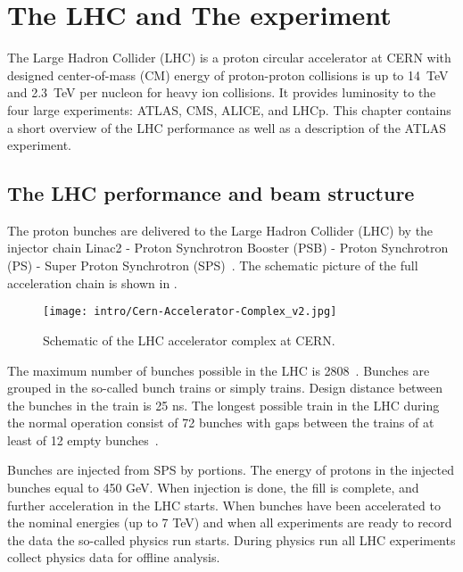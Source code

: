 

\chapter{The LHC and The \ATLAS experiment}
\label{chap:MoreStuff}

The Large Hadron Collider (LHC) is a proton circular accelerator at CERN with designed center-of-mass (CM) energy of proton-proton collisions is up to 14~TeV and 2.3~TeV per nucleon for heavy ion collisions.
It provides luminosity to the four large experiments: ATLAS, CMS, ALICE, and LHCp. This chapter contains a short overview of the LHC performance as well as a description of the ATLAS experiment.

\section{The LHC performance and beam structure}

The proton bunches are delivered to the Large Hadron Collider (LHC) 
by the injector chain Linac2 - Proton Synchrotron Booster (PSB) - Proton Synchrotron (PS) - Super Proton Synchrotron (SPS)~\cite{lhc_tdr_vol3}.
The schematic picture of the full acceleration chain is shown in .

\begin{figure}[]
  \centering
\texttt{[image: intro/Cern-Accelerator-Complex\_v2.jpg]}
\caption{Schematic of the LHC accelerator complex at CERN.}
\label{fig:accelerator_complex}
\end{figure}

The maximum number of bunches possible in the LHC is 2808~\cite{lhc_tdr_vol1}.
Bunches are grouped in the so-called bunch trains or simply trains.
Design distance between the bunches in the train is 25 ns.
The longest possible train in the LHC during the normal operation consist of 72 bunches with gaps between the trains of at least of 12 empty bunches~\cite{lhc_tdr_vol3}.

Bunches are injected from SPS by portions. 
The energy of protons in the injected bunches equal to 450 GeV.
When injection is done, the fill is complete, and further acceleration in the LHC starts.
When bunches have been accelerated to the nominal energies (up to 7 TeV) and when all experiments are ready to record the data the so-called physics run starts. During physics run all LHC experiments collect physics data for offline analysis. 

